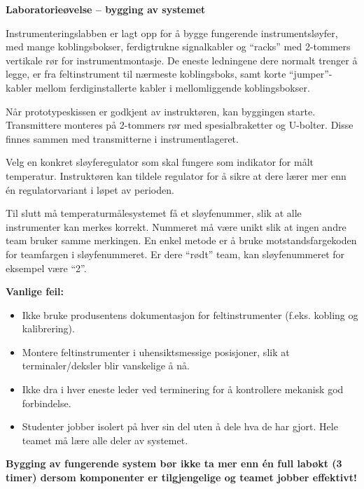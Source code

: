 \vfil \eject

\noindent
{\bf Laboratorieøvelse -- bygging av systemet}

\vskip 5pt

Instrumenteringslabben er lagt opp for å bygge fungerende instrumentsløyfer, med mange koblingsbokser, ferdigtrukne signalkabler og ``racks'' med 2-tommers vertikale rør for instrumentmontasje. De eneste ledningene dere normalt trenger å legge, er fra feltinstrument til nærmeste koblingsboks, samt korte ``jumper''-kabler mellom ferdiginstallerte kabler i mellomliggende koblingsbokser.

Når prototypeskissen er godkjent av instruktøren, kan byggingen starte. Transmittere monteres på 2-tommers rør med spesialbraketter og U-bolter. Disse finnes sammen med transmitterne i instrumentlageret.

Velg en konkret sløyferegulator som skal fungere som indikator for målt temperatur. Instruktøren kan tildele regulator for å sikre at dere lærer mer enn én regulatorvariant i løpet av perioden.

Til slutt må temperaturmålesystemet få et sløyfenummer, slik at alle instrumenter kan merkes korrekt. Nummeret må være unikt slik at ingen andre team bruker samme merkingen. En enkel metode er å bruke motstandsfargekoden for teamfargen i sløyfenummeret. Er dere ``rødt'' team, kan sløyfenummeret for eksempel være ``2''.

\vskip 10pt

{\bf Vanlige feil:}

\begin{itemize}
\item{} Ikke bruke produsentens dokumentasjon for feltinstrumenter (f.eks. kobling og kalibrering).
\item{} Montere feltinstrumenter i uhensiktsmessige posisjoner, slik at terminaler/deksler blir vanskelige å nå.
\item{} Ikke dra i hver eneste leder ved terminering for å kontrollere mekanisk god forbindelse.
\item{} Studenter jobber isolert på hver sin del uten å dele hva de har gjort. Hele teamet må lære alle deler av systemet.
\end{itemize}

{\bf Bygging av fungerende system bør ikke ta mer enn én full labøkt (3 timer) dersom komponenter er tilgjengelige og teamet jobber effektivt!}



\vfil \eject

